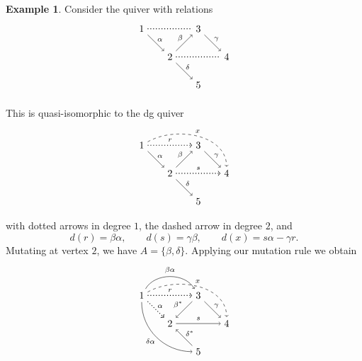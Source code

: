 \documentclass[a4paper,11pt]{amsart}
\theoremstyle{definition}
\newtheorem{example}[theorem]{Example}
\numberwithin{theorem}{section}
\begin{document}
\begin{example}
Consider the quiver with relations
\[ \begin{tikzpicture}
 \node (1) at (0,2) {$1$};
 \node (2) at (1,1) {$2$};
 \node (3) at (2,2) {$3$};
 \node (4) at (3,1) {$4$};
 \node (5) at (2,0) {$5$};
 \draw (1) [->] to node [above right=-2pt] {\scriptsize $\alpha$} (2);
 \draw (2) [->] to node [above left=-2pt] {\scriptsize $\beta$} (3);
 \draw (3) [->] to node [above right=-2pt] {\scriptsize $\gamma$} (4);
 \draw (2) [->] to node [above right=-2pt] {\scriptsize $\delta$} (5);
 \draw (1) [dotted, thick] to (3);
 \draw (2) [dotted, thick] to (4);
\end{tikzpicture} \]

This is quasi-isomorphic to the dg quiver
\[ \begin{tikzpicture}
 \node (1) at (0,2) {$1$};
 \node (2) at (1,1) {$2$};
 \node (3) at (2,2) {$3$};
 \node (4) at (3,1) {$4$};
 \node (5) at (2,0) {$5$};
 \draw (1) [->] to node [above right=-2pt] {\scriptsize $\alpha$} (2);
 \draw (2) [->] to node [above left=-2pt] {\scriptsize $\beta$} (3);
 \draw (3) [->] to node [above right=-2pt] {\scriptsize $\gamma$} (4);
 \draw (2) [->] to node [above right=-2pt] {\scriptsize $\delta$} (5);
 \draw (1) [->,dotted, thick] to node [above] {\scriptsize $r$} (3);
 \draw (2) [->,dotted, thick] to node [above] {\scriptsize $s$} (4);
 \draw (1) [->,dashed,out=30,in=90] to node [above] {\scriptsize $x$} (4);
\end{tikzpicture} \]
with dotted arrows in degree $1$, the dashed arrow in degree $2$, and
\[ d(r) = \beta \alpha, \qquad d(s) = \gamma \beta, \qquad d(x) = s \alpha - \gamma r. \]
Mutating at vertex $2$, we have $A = \{ \beta, \delta \}$. Applying our mutation rule we obtain
\[ \begin{tikzpicture}
 \node (1) at (0,2) {$1$};
 \node (2) at (1,1) {$2$};
 \node (3) at (2,2) {$3$};
 \node (4) at (3,1) {$4$};
 \node (5) at (2,0) {$5$};
 \draw (1) [->,dotted,thick] to node [above right=-2pt] {\scriptsize $\alpha$} (2);
 \draw (3) [->] to node [above left=-2pt] {\scriptsize $\beta^*$} (2);
 \draw (3) [->] to node [above right=-2pt] {\scriptsize $\gamma$} (4);
 \draw (5) [->] to node [above right=-2pt] {\scriptsize $\delta^*$} (2);
 \draw (1) [->,dotted, thick] to node [above] {\scriptsize $r$} (3);
 \draw (2) [->] to node [above] {\scriptsize $s$} (4);
 \draw (1) [->,dashed,out=30,in=90] to node [above] {\scriptsize $x$} (4);
 \draw (1) [->,out=60,in=120] to node [above] {\scriptsize $\beta \alpha$} (3);
 \draw (1) [->,out=-90,in=180] to node [below left=-2pt] {\scriptsize $\delta \alpha$} (5);

\end{tikzpicture}\]
\end{example}
\end{document}

